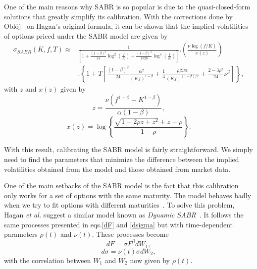 One of the main reasons why SABR is so popular is due to the quasi-closed-form solutions that greatly simplify its calibration. With the corrections done by Oblój~\cite{Obloj} on Hagan's original formula, it can be shown that the implied volatilities of options priced under the SABR model are given by
\begin{equation}\label{sabr}
\begin{split}
\sigma_{SABR}(K,f,T)\approx&\frac{1}{\displaystyle\left[1+\frac{(1-\beta)^2}{24}\log^2\left(\frac{f}{K}\right)+\frac{(1-\beta)^4}{1920}\log^4\left(\frac{f}{K}\right)\right]}.\left(\frac{\nu\log\left(f/K\right)}{x(z)}\right)\\
&.\left\{1+T\left[\frac{(1-\beta)^2}{24}\frac{\alpha^2}{(Kf)^{1-\beta}}+\frac{1}{4}\frac{\rho\beta\nu\alpha}{(Kf)^{(1-\beta)/2}}+\frac{2-3\rho^2}{24}\nu^2\right]\right\},
\end{split}
\end{equation}
\noindent with $z$ and $x(z)$ given by
\begin{equation}
z=\frac{\nu\left(f^{1-\beta}-K^{1-\beta}\right)}{\alpha(1-\beta)},
\end{equation}
\begin{equation}
x(z)=\log\left\{\frac{\sqrt{1-2\rho z+z^2}+z-\rho}{1-\rho}\right\}.
\end{equation}

With this result, calibrating the SABR model is fairly straightforward. We simply need to find the parameters that minimize the difference between the implied volatilities obtained from the model and those obtained from market data.

One of the main setbacks of the SABR model is the fact that this calibration only works for a set of options with the same maturity. The model behaves badly when we try to fit options with different maturities~\cite{Hagan}. To solve this problem, Hagan \textit{et al.} suggest a similar model known as \emph{Dynamic SABR}~\cite{Hagan}. It follows the same processes presented in eqs.\eqref{dF} and \eqref{dsigma} but with time-dependent parameters $\rho(t)$ and $\nu(t)$.
These processes become
\begin{equation}\label{dF2}
dF=\sigma F^\beta dW_1,
\end{equation}
\begin{equation}\label{dsigma2}
d\sigma=\nu(t)\sigma dW_2,
\end{equation}
\noindent with the correlation between $W_1$ and $W_2$ now given by $\rho(t)$.

